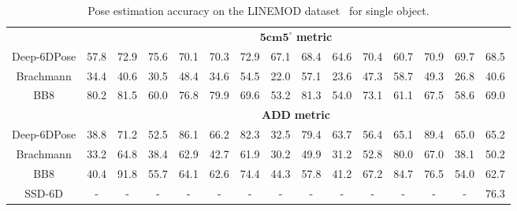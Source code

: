\documentclass[conference]{IEEEtran}
\newcommand{\method}[1]{Deep-6DPose}
\begin{document}
\begin{table*}[!t]
\begin{center}
\begin{tabular}{c| c c c c c c c c c c c c c c}
   	\hline
   	   	   	&\multicolumn{14}{c}{$\mathbf{5cm5^\circ}$ \textbf{metric}} \\
\method{} &57.8 &72.9 &75.6 &70.1 &70.3 &72.9 &67.1 &68.4 &64.6 &70.4 &60.7 &70.9 &69.7 &68.5\\ 
Brachmann\cite{CVPR16} &34.4 &40.6 &30.5 &48.4 &34.6 &54.5 &22.0 &57.1 &23.6 &47.3 &58.7 &49.3 &26.8 &40.6\\
BB8\cite{BB8} &80.2 &81.5 &60.0 &76.8 &79.9 &69.6 &53.2 &81.3 &54.0 &73.1 &61.1 &67.5 &58.6 &69.0\\
   	\hline   	
   	   	&\multicolumn{14}{c}{$\mathbf{ADD}$ \textbf{metric}} \\
\method{} &38.8 &71.2 &52.5 &86.1 &66.2 &82.3 &32.5 &79.4 &63.7 &56.4 &65.1 &89.4 &65.0 &65.2\\ 
Brachmann\cite{CVPR16}  &33.2 &64.8 &38.4 &62.9 &42.7 &61.9 &30.2 &49.9 &31.2 &52.8 &80.0 &67.0 &38.1 &50.2\\
BB8\cite{BB8} &40.4 &91.8 &55.7 &64.1 &62.6 &74.4 &44.3 &57.8 &41.2 &67.2 &84.7 &76.5 &54.0 &62.7\\
SSD-6D\cite{SSD-6D} &- &- &- &- &- &- &- &- &- &- &- &- &- &76.3\\
   	\hline   	
    \end{tabular}
    \end{center}
   \vspace{-0.2cm}
    \caption{Pose estimation accuracy on the LINEMOD dataset~\cite{ACCV12} for single object.}
    \label{tab:pose} 
\end{table*}\begin{figure*}[!t]
\vspace{0.1cm}
\centering
{}
\\
\vspace{0.1cm}
\subfigure{
}
\end{figure*}
\end{document}
